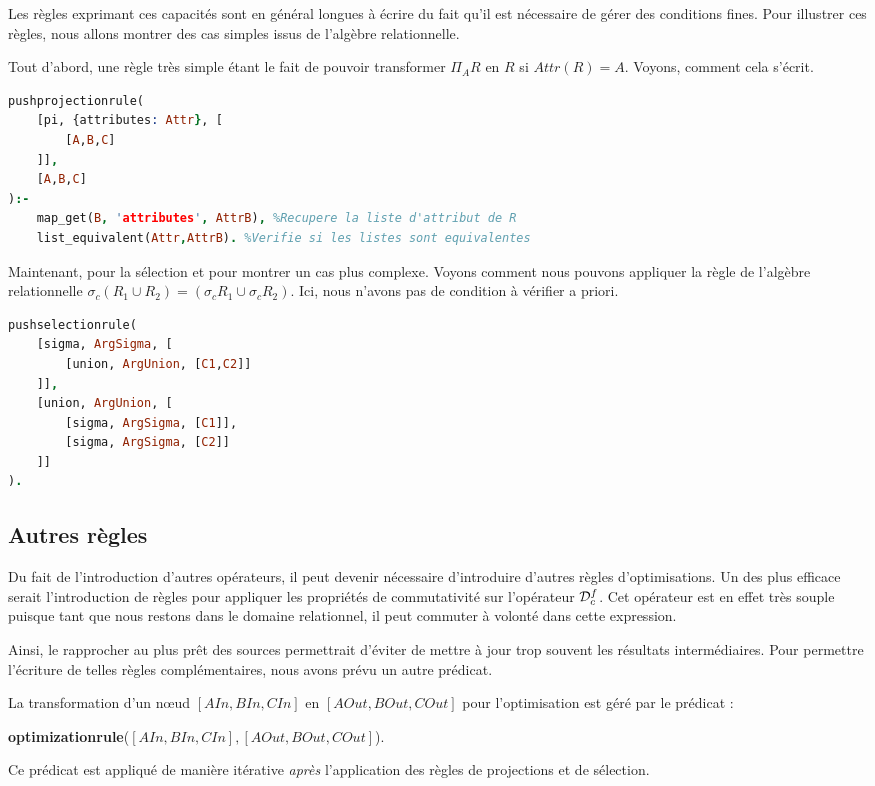 Les règles exprimant ces capacités sont en général longues à écrire du fait qu'il est nécessaire de gérer des conditions fines. Pour illustrer ces règles, nous allons montrer des cas simples issus de l'algèbre relationnelle.
\begin{example}
	Tout d'abord, une règle très simple étant le fait de pouvoir transformer $\Pi_A R$ en $R$ si $Attr(R)=A$. Voyons, comment cela s'écrit.
	\begin{lstlisting}[language=Prolog]
pushprojectionrule(
    [pi, {attributes: Attr}, [
        [A,B,C]
    ]],
    [A,B,C]
):-
    map_get(B, 'attributes', AttrB), %Recupere la liste d'attribut de R
    list_equivalent(Attr,AttrB). %Verifie si les listes sont equivalentes
	\end{lstlisting}
	
	Maintenant, pour la sélection et pour montrer un cas plus complexe. Voyons comment nous pouvons appliquer la règle de l'algèbre relationnelle $\sigma_c (R_1 \cup R_2) = (\sigma_c R_1 \cup \sigma_c R_2)$. Ici, nous n'avons pas de condition à vérifier a priori.
	\begin{lstlisting}[language=Prolog]
pushselectionrule(
    [sigma, ArgSigma, [
        [union, ArgUnion, [C1,C2]]
    ]],
    [union, ArgUnion, [
        [sigma, ArgSigma, [C1]], 
        [sigma, ArgSigma, [C2]]
    ]]
).
	\end{lstlisting}
\end{example}

\subsection{Autres règles}
Du fait de l'introduction d'autres opérateurs, il peut devenir nécessaire d'introduire d'autres règles d'optimisations. Un des plus efficace serait l'introduction de règles pour appliquer les propriétés de commutativité sur l'opérateur $\mathcal{D}_c^f$. Cet opérateur est en effet très souple puisque tant que nous restons dans le domaine relationnel, il peut commuter à volonté dans cette expression.

Ainsi, le rapprocher au plus prêt des sources permettrait d'éviter de mettre à jour trop souvent les résultats intermédiaires. Pour permettre l'écriture de telles règles complémentaires, nous avons prévu un autre prédicat.
\begin{regle}
La transformation d'un nœud $[AIn,BIn,CIn]$ en $[AOut,BOut,COut]$ pour l'optimisation est géré par le prédicat :
\begin{center} \textbf{optimizationrule}($[AIn,BIn,CIn],[AOut,BOut,COut]$).\end{center}
Ce prédicat est appliqué de manière itérative \textit{après} l'application des règles de projections et de sélection.
\end{regle}

